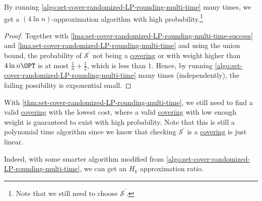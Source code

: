 \begin{theorem}\label{thm:set-cover-randomized-LP-rounding-multi-time}
	By running \autoref{algo:set-cover-randomized-LP-rounding-multi-time} many times, we get a \((4\ln n)\)-approximation algorithm with high probability.\footnote{Note that we still need to choose \(\mathcal{S}^\prime \).}
\end{theorem}
\begin{proof}
	Together with \autoref{lma:set-cover-randomized-LP-rounding-multi-time-success} and \autoref{lma:set-cover-randomized-LP-rounding-multi-time} and using the union bound, the probability of \(\mathcal{S} ^\prime \) not being a \hyperref[def:covering]{covering} or with weight higher than \(4\ln n\OPT\) is at most \(\frac{1}{n} + \frac{1}{2}\), which is less than \(1\). Hence, by running \autoref{algo:set-cover-randomized-LP-rounding-multi-time} many times (independently), the failing possibility is exponential small.
\end{proof}

\begin{note}
	With \autoref{thm:set-cover-randomized-LP-rounding-multi-time}, we still need to find a valid \hyperref[def:covering]{covering} with the lowest cost, where a valid \hyperref[def:covering]{covering} with low enough weight is guaranteed to exist with high probability. Note that this is still a polynomial time algorithm since we know that checking \(\mathcal{S} ^\prime \) is a \hyperref[def:covering]{covering} is just linear.
\end{note}

\begin{remark}
	Indeed, with some smarter algorithm modified from \autoref{algo:set-cover-randomized-LP-rounding-multi-time}, we can get an \(H_k\) approximation ratio.
\end{remark}